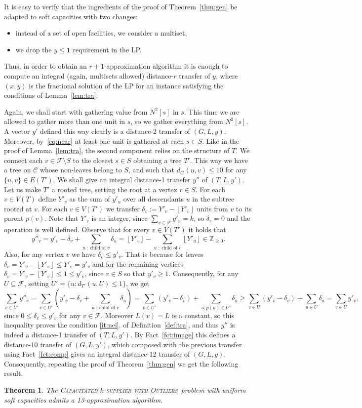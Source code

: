 \documentclass{article}
\newcommand{\F}{\mathcal{F}}
\newcommand{\C}{\mathcal{C}}
\newcommand{\pint}{\mathbb{Z}_{\ge 0}}
\newcommand{\sub}{\subseteq}
\newcommand{\floor}[1]{\left\lfloor #1 \right\rfloor}
\newcommand{\sm}{\setminus}
\newcommand{\fullsup}{\textsc{Capacitated} $k$-\textsc{supplier with Outliers}}
\theoremstyle{plain}
\newtheorem{theorem}{Theorem}
\theoremstyle{definition}
\begin{document}
It is easy to verify that the ingredients of the proof of
Theorem~\ref{thm:gen} be adapted to soft capacities with two changes:
\begin{itemize}
  \item instead of a set of open facilities, we consider a multiset,
  \item we drop the $y\le \mathbf{1}$ requirement in the LP.
\end{itemize}
Thus, in order to obtain an $r+1$-approximation algorithm it is enough to compute an integral (again, multisets
allowed) distance-$r$ transfer of $y$, where $(x,y)$ is the fractional solution
of the LP for an instance satisfying the conditions of Lemma~\ref{lem:tra}.

Again, we shall start with gathering value from $N^2[s]$ in $s$. This time we
are allowed to gather more than one unit in $s$, so we gather everything from
$N^2[s]$. A vector $y'$ defined this way clearly is a distance-2
transfer of $(G,L,y)$. Moreover, by~\eqref{eq:near} at least one unit is gathered
at each $s\in S$. Like in the proof of Lemma~\ref{lem:tra}, the second component
relies on the structure of $T$.
We connect each $v\in \F\sm S$ to the closest $s\in S$ obtaining a tree $T'$.
This way we have a tree on $\C$ whose non-leaves belong to $S$, and
such that $d_G(u,v)\le 10$ for any $\{u,v\}\in E(T')$.
We shall give an integral distance-1 transfer $y''$ of $(T,L,y')$.
Let us make $T'$ a rooted tree, setting the root at a vertex $r\in S$.
For each $v\in V(T)$ define $Y'_v$ as the sum of $y'_u$ over all descendants $u$ in the
subtree rooted at $v$. 
For each $v\in V(T')$ we transfer $\delta_v := Y'_v - \floor{Y'_v}$ units from $v$ to
its parent $p(v)$.  Note that $Y'_r$ is an integer, since $\sum_{v\in \F}
y'_v = k$, so $\delta_r=0$ and the operation is well defined. 
Observe that for every $v\in V(T')$ it holds that
$$y''_v = y'_v-\delta_v + \sum_{u\;:\:\text{child of }v}\delta_u = \floor{Y'_v}-\sum_{u\;:\; \text{child of }v} \floor{Y'_u}\in \pint.$$
 Also, for any vertex $v$ we have $\delta_v \le y'_v$. That is because for leaves
$\delta_v = Y'_v - \floor{Y'_v} \le Y'_v = y'_v$ and for the remaining vertices $\delta_v = Y'_v -
\floor{Y'_v} \le 1 \le y'_v$, since $v\in S$ so that $y'_v\ge 1$.
Consequently, for any $U\sub \F$, setting $U'=\{u:d_{T'}(u,U)\le 1\}$, we get
$$\sum_{v\in U'}y''_v = \sum_{v\in U'}\left(y'_v-\delta_v + \sum_{u\;:\:\text{child of }v}\delta_u\right)=
\sum_{v\in U'}(y'_v-\delta_v)+\sum_{u:p(u)\in U'}\delta_u \ge\sum_{v\in U}(y'_v-\delta_v)+\sum_{u\in U}\delta_u = \sum_{v\in U}y'_v,$$
since $0\le \delta_v\le y'_v$ for any $v\in \F$. Moreover $L(v)=L$ is a constant, so this inequality 
proves the condition \ref{it:nei}. of Definition~\ref{def:tra}, and thus $y''$ is indeed a distance-1 transfer of $(T,L,y')$.
By Fact~\ref{fct:image} this defines a distance-10 transfer of $(G,L,y')$,
which composed with the previous transfer using Fact~\ref{fct:comp} gives an
integral distance-12 transfer of $(G,L,y)$.
Consequently, repeating the proof of Theorem~\ref{thm:gen} we get the
following result.
\begin{theorem}
The \fullsup\  problem with uniform soft capacities admits a 13-approximation
algorithm.
\end{theorem}
\end{document}
